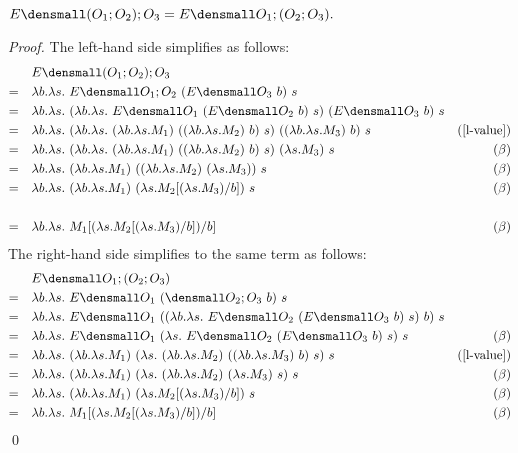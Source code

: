 \begin{lemma}
  \label{thm:ext-compose-assoc}

  $ E\den{(O_1;O_2);O_3} = E\den{O_1;(O_2;O_3)}.$
\end{lemma}
\begin{proof}
  The left-hand side simplifies as follows:
  \begin{align*}
    &\quad E\den{(O_1;O_2);O_3} \\
    =& \quad \lambda b. \lambda s.~ E\den{O_1;O_2} ~(E\den{O_3} ~b) ~s \\
    =& \quad \lambda b. \lambda s.~ (\lambda b. \lambda s.~ E\den{O_1} ~(E\den{O_2} ~b) ~s) ~(E\den{O_3} ~b) ~s \\
    =& \quad \lambda b. \lambda s.~ (\lambda b. \lambda s.~ (\lambda b. \lambda s. M_1) ~((\lambda b. \lambda s. M_2) ~b) ~s) ~((\lambda b. \lambda s. M_3) ~b) ~s & (\cref{l-value}) \\
    =& \quad \lambda b. \lambda s.~ (\lambda b. \lambda s.~ (\lambda b. \lambda s. M_1) ~((\lambda b. \lambda s. M_2) ~b) ~s) ~(\lambda s. M_3) ~s & (\beta) \\
    =& \quad \lambda b. \lambda s.~ (\lambda b. \lambda s. M_1) ~((\lambda b. \lambda s. M_2) ~(\lambda s. M_3)) ~s & (\beta) \\
    =& \quad \lambda b. \lambda s.~ (\lambda b. \lambda s. M_1) ~(\lambda s. M_2\subst{b}{(\lambda s. M_3)}) ~s & (\beta) \\
    \\
    =& \quad \lambda b. \lambda s.~ M_1\subst{b}{(\lambda s. M_2\subst{b}{(\lambda s. M_3)})} & (\beta) \\
  \end{align*}
  The right-hand side simplifies to the same term as follows:
  \begin{align*}
    &\quad E\den{O_1;(O_2;O_3)} \\
    =& \quad \lambda b. \lambda s.~ E\den{O_1} ~(\den{O_2;O_3} ~b) ~s \\
    =& \quad \lambda b. \lambda s.~ E\den{O_1} ~((\lambda b. \lambda s.~ E\den{O_2} ~(E\den{O_3} ~b) ~s) ~b) ~s \\
    =& \quad \lambda b. \lambda s.~ E\den{O_1} ~(\lambda s.~ E\den{O_2} ~(E\den{O_3} ~b) ~s) ~s & (\beta)\\
    =& \quad \lambda b. \lambda s.~ (\lambda b. \lambda s. M_1) ~(\lambda s.~ (\lambda b. \lambda s. M_2) ~((\lambda b. \lambda s. M_3) ~b) ~s) ~s & (\cref{l-value}) \\
    =& \quad \lambda b. \lambda s.~ (\lambda b. \lambda s. M_1) ~(\lambda s.~ (\lambda b. \lambda s. M_2) ~(\lambda s. M_3) ~s) ~s & (\beta) \\
    =& \quad \lambda b. \lambda s.~ (\lambda b. \lambda s. M_1) ~(\lambda s. M_2\subst{b}{(\lambda s. M_3)}) ~s & (\beta) \\
    =& \quad \lambda b. \lambda s.~ M_1\subst{b}{(\lambda s. M_2\subst{b}{(\lambda s. M_3)})} & (\beta)
  \end{align*}
  \qed
\end{proof}

